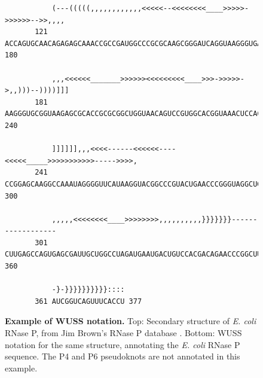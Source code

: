 \begin{figure}[tp]
\begin{center}
{\begin{BVerbatim}
           (---(((((,,,,,,,,,,,,<<<<<--<<<<<<<<____>>>>>->>>>>>-->>,,,,
       121 ACCAGUGCAACAGAGAGCAAACCGCCGAUGGCCCGCGCAAGCGGGAUCAGGUAAGGGUGA 180     

           ,,,<<<<<<_______>>>>>><<<<<<<<<____>>>->>>>>->,,)))--))))]]]
       181 AAGGGUGCGGUAAGAGCGCACCGCGCGGCUGGUAACAGUCCGUGGCACGGUAAACUCCAC 240     

           ]]]]]],,,<<<<------<<<<<<----<<<<<_____>>>>>>>>>>>----->>>>,
       241 CCGGAGCAAGGCCAAAUAGGGGUUCAUAAGGUACGGCCCGUACUGAACCCGGGUAGGCUG 300     

           ,,,,,<<<<<<<<____>>>>>>>>,,,,,,,,,,}}}}}}}------------------
       301 CUUGAGCCAGUGAGCGAUUGCUGGCCUAGAUGAAUGACUGUCCACGACAGAACCCGGCUU 360     

           -}-}}}}}}}}}}::::
       361 AUCGGUCAGUUUCACCU 377     
\end{BVerbatim} 
}
\end{center}
\caption{\small \textbf{Example of WUSS notation.} Top: Secondary
structure of \emph{E. coli} RNase P, from Jim Brown's RNase P database
\citep{Brown99}. Bottom: WUSS notation for the same structure,
annotating the \emph{E. coli} RNase P sequence. The P4 and P6
pseudoknots are not annotated in this example.}
\label{fig:RNaseP}
\end{figure}

